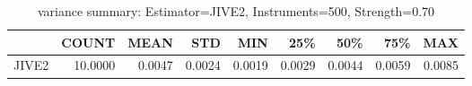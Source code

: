 \begin{table}[ht]
\centering
\caption{variance summary: Estimator=JIVE2, Instruments=500, Strength=0.70}
\begin{tabular}{lrrrrrrrr}
\toprule
 & COUNT & MEAN & STD & MIN & 25\% & 50\% & 75\% & MAX \\
\midrule
JIVE2 & 10.0000 & 0.0047 & 0.0024 & 0.0019 & 0.0029 & 0.0044 & 0.0059 & 0.0085 \\
\bottomrule
\end{tabular}
\end{table}
